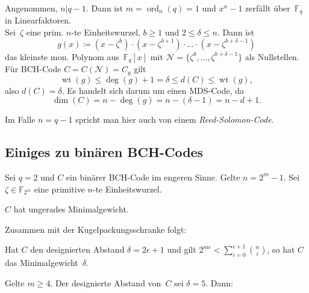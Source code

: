 \documentclass{cheat-sheet}
\newcommand{\F}{\mathbb{F}} %
\DeclareMathOperator{\wt}{wt} %
\newcommand{\divides}{|} %
\DeclareMathOperator{\ord}{ord} %
\begin{document}

\begin{konstr}
  Angenommen, $n \divides q - 1$.
  Dann ist $m = \ord_n(q) = 1$ und $x^n - 1$ zerfällt über~$\F_q$ in Linearfaktoren. \\
  Sei~$\zeta$ eine prim. $n$-te Einheitswurzel, $b \geq 1$ und $2 \leq \delta \leq n$.
  Dann ist
  \[
    g(x) \coloneqq (x - \zeta^b) \cdot (x - \zeta^{b+1}) \cdot \ldots \cdot (x - \zeta^{b + \delta - 1})
  \]
  das kleinste mon. Polynom aus~$\F_q[x]$ mit $\mathcal{N} = \{ \zeta^b, \ldots, \zeta^{b+\delta-1} \}$ als Nullstellen.
  Für BCH-Code $C = C(\mathcal{N}) = C_g$ gilt
  \[
    \wt(g) \leq \deg(g) + 1 = \delta \leq d(C) \leq \wt(g),
  \]
  also $d(C) = \delta$.
  Es handelt sich darum um einen MDS-Code, da
  \[
    \dim(C) = n - \deg(g) = n - (\delta - 1) = n - d + 1.
  \]
\end{konstr}

\begin{defn}
  Im Falle $n = q - 1$ spricht man hier auch von einem \emph{Reed-Solomon-Code}.
\end{defn}

\subsection{Einiges zu binären BCH-Codes}

Sei $q = 2$ und $C$ ein binärer BCH-Code im engeren Sinne.
Gelte $n = 2^m - 1$.
Sei $\zeta \in \F_{2^m}$ eine primitive $n$-te Einheitswurzel.

\begin{satz}
  $C$ hat ungerades Minimalgewicht.
\end{satz}

Zusammen mit der Kugelpackungsschranke folgt:

\begin{prop}
  Hat $C$ den designierten Abstand $\delta = 2 \epsilon + 1$ und gilt $2^{m \epsilon} < {\sum}_{i=0}^{\epsilon + 1} \binom{n}{i}$, so hat $C$ das Minimalgewicht~$\delta$.
\end{prop}

\begin{satz}
  Gelte $m \geq 4$.
  Der designierte Abstand von~$C$ sei $\delta = 5$.
  Dann:
  \begin{itemize}
  \end{itemize}
\end{satz}
\end{document}
